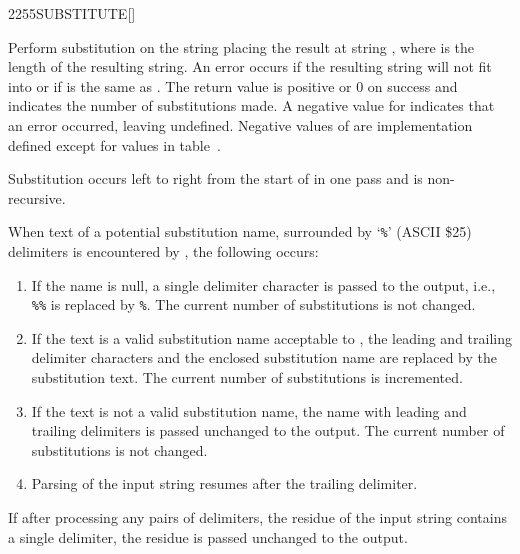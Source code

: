 \enlargethispage{4ex}
\begin{worddef}{2255}{SUBSTITUTE}[]%
\item {}

	Perform substitution on the string  placing
	the result at string , where  is
	the length of the resulting string.
	An error occurs if the resulting string will not fit into
	 or if  is the same as .
	The return value  is positive or 0 on success and indicates the
	number of substitutions made.
	A negative value for  indicates that an error occurred, leaving
	 undefined.
	Negative values of  are implementation defined except for
	values in table~.

	Substitution occurs left to right from the start of 
	in one pass and is non-recursive.

	When text of a potential substitution name, surrounded by `\texttt{\%}' (ASCII \$25) delimiters
	is encountered by , the following occurs:

	\begin{enumerate}
	\item If the name is null, a single delimiter character is passed
		to the output, i.e., \texttt{\%\%} is replaced by \texttt{\%}.
		The current number of substitutions is not changed.

	\item If the text is a valid substitution name acceptable to
		, the leading and trailing delimiter
		characters and the enclosed substitution name are replaced by
		the substitution text.  The current number of substitutions
		is incremented.

	\item If the text is not a valid substitution name, the name with
		leading	and trailing delimiters is passed unchanged to the
		output.  The current number of substitutions is not changed.

	\item Parsing of the input string resumes after the trailing delimiter.
	\end{enumerate}

	If after processing any pairs of delimiters, the residue of the input string contains
	a single delimiter, the residue is passed unchanged to the output.


\end{worddef}
